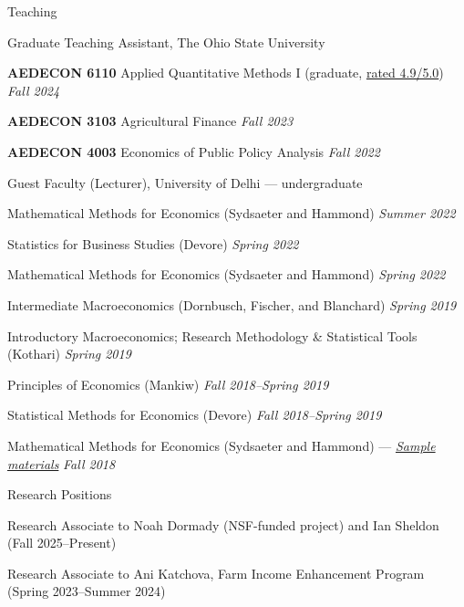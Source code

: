 \documentclass{resume} %
\begin{document}
\begin{rSection}{Teaching}
\begin{rSubsection}{Graduate Teaching Assistant, The Ohio State University}{}{}{}
\item \textbf{AEDECON 6110} Applied Quantitative Methods I (graduate, \href{https://drive.google.com/file/d/1ER9QXfDBzWHufH4bhnwJmun1IvfywKyv/view?usp=drive_link}{rated 4.9/5.0}) \hfill \textit{Fall 2024}
\item \textbf{AEDECON 3103} Agricultural Finance \hfill \textit{Fall 2023}
\item \textbf{AEDECON 4003} Economics of Public Policy Analysis \hfill \textit{Fall 2022}
\end{rSubsection}

\begin{rSubsection}{Guest Faculty (Lecturer), University of Delhi --- undergraduate}{}{}{}
\item Mathematical Methods for Economics (Sydsaeter and Hammond) \hfill \textit{Summer 2022}
\item Statistics for Business Studies (Devore) \hfill \textit{Spring 2022}
\item Mathematical Methods for Economics (Sydsaeter and Hammond) \hfill \textit{Spring 2022}
\item Intermediate Macroeconomics (Dornbusch, Fischer, and Blanchard) \hfill \textit{Spring 2019}
\item Introductory Macroeconomics; Research Methodology \& Statistical Tools (Kothari) \hfill \textit{Spring 2019}
\item Principles of Economics (Mankiw) \hfill \textit{Fall 2018--Spring 2019}
\item Statistical Methods for Economics (Devore) \hfill \textit{Fall 2018--Spring 2019}
\item Mathematical Methods for Economics (Sydsaeter and Hammond) --- \href{https://drive.google.com/drive/folders/1rdvYT-LeTV4SWpAt8DZqX7DD4lrPtz9E?usp=sharing}{\textit{Sample materials}} \hfill \textit{Fall 2018}
\end{rSubsection}
\end{rSection}

\begin{rSection}{Research Positions}
\vspace{-1em}
\item Research Associate to Noah Dormady (NSF-funded project) and Ian Sheldon \hfill (Fall 2025--Present)
\item Research Associate to Ani Katchova, Farm Income Enhancement Program \hfill (Spring 2023--Summer 2024)
\end{rSection}
\end{document}
